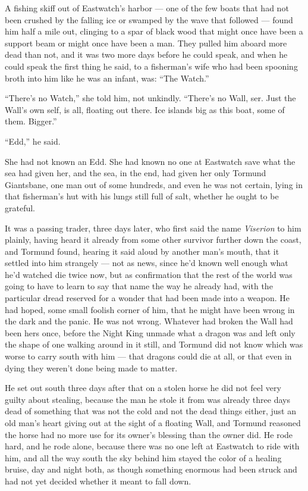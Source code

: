 A fishing skiff out of Eastwatch’s harbor — one of the few boats that had not been crushed by the falling ice or swamped by the wave that followed — found him half a mile out, clinging to a spar of black wood that might once have been a support beam or might once have been a man. They pulled him aboard more dead than not, and it was two more days before he could speak, and when he could speak the first thing he said, to a fisherman’s wife who had been spooning broth into him like he was an infant, was: “The Watch.”

“There’s no Watch,” she told him, not unkindly. “There’s no Wall, ser. Just the Wall’s own self, is all, floating out there. Ice islands big as this boat, some of them. Bigger.”

“Edd,” he said.

She had not known an Edd. She had known no one at Eastwatch save what the sea had given her, and the sea, in the end, had given her only Tormund Giantsbane, one man out of some hundreds, and even he was not certain, lying in that fisherman’s hut with his lungs still full of salt, whether he ought to be grateful.

It was a passing trader, three days later, who first said the name \textit{Viserion} to him plainly, having heard it already from some other survivor further down the coast, and Tormund found, hearing it said aloud by another man’s mouth, that it settled into him strangely — not as news, since he’d known well enough what he’d watched die twice now, but as confirmation that the rest of the world was going to have to learn to say that name the way he already had, with the particular dread reserved for a wonder that had been made into a weapon. He had hoped, some small foolish corner of him, that he might have been wrong in the dark and the panic. He was not wrong. Whatever had broken the Wall had been hers once, before the Night King unmade what a dragon was and left only the shape of one walking around in it still, and Tormund did not know which was worse to carry south with him — that dragons could die at all, or that even in dying they weren’t done being made to matter.

He set out south three days after that on a stolen horse he did not feel very guilty about stealing, because the man he stole it from was already three days dead of something that was not the cold and not the dead things either, just an old man’s heart giving out at the sight of a floating Wall, and Tormund reasoned the horse had no more use for its owner’s blessing than the owner did. He rode hard, and he rode alone, because there was no one left at Eastwatch to ride with him, and all the way south the sky behind him stayed the color of a healing bruise, day and night both, as though something enormous had been struck and had not yet decided whether it meant to fall down.

